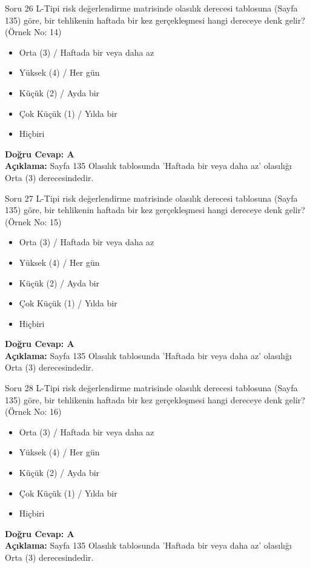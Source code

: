 \documentclass[12pt,a4paper]{article}
\begin{document}
\begin{testcard}{Soru 26}
    L-Tipi risk değerlendirme matrisinde olasılık derecesi tablosuna (Sayfa 135) göre, bir tehlikenin haftada bir kez gerçekleşmesi hangi dereceye denk gelir? (Örnek No: 14)
    \begin{itemize}
        \item[A)] Orta (3) / Haftada bir veya daha az
        \item[B)] Yüksek (4) / Her gün
        \item[C)] Küçük (2) / Ayda bir
        \item[D)] Çok Küçük (1) / Yılda bir
        \item[E)] Hiçbiri
    \end{itemize}
    \tcblower
    \textbf{Doğru Cevap: A} \\
    \textbf{Açıklama:} Sayfa 135 Olasılık tablosunda 'Haftada bir veya daha az' olasılığı Orta (3) derecesindedir.
\end{testcard}

\begin{testcard}{Soru 27}
    L-Tipi risk değerlendirme matrisinde olasılık derecesi tablosuna (Sayfa 135) göre, bir tehlikenin haftada bir kez gerçekleşmesi hangi dereceye denk gelir? (Örnek No: 15)
    \begin{itemize}
        \item[A)] Orta (3) / Haftada bir veya daha az
        \item[B)] Yüksek (4) / Her gün
        \item[C)] Küçük (2) / Ayda bir
        \item[D)] Çok Küçük (1) / Yılda bir
        \item[E)] Hiçbiri
    \end{itemize}
    \tcblower
    \textbf{Doğru Cevap: A} \\
    \textbf{Açıklama:} Sayfa 135 Olasılık tablosunda 'Haftada bir veya daha az' olasılığı Orta (3) derecesindedir.
\end{testcard}

\begin{testcard}{Soru 28}
    L-Tipi risk değerlendirme matrisinde olasılık derecesi tablosuna (Sayfa 135) göre, bir tehlikenin haftada bir kez gerçekleşmesi hangi dereceye denk gelir? (Örnek No: 16)
    \begin{itemize}
        \item[A)] Orta (3) / Haftada bir veya daha az
        \item[B)] Yüksek (4) / Her gün
        \item[C)] Küçük (2) / Ayda bir
        \item[D)] Çok Küçük (1) / Yılda bir
        \item[E)] Hiçbiri
    \end{itemize}
    \tcblower
    \textbf{Doğru Cevap: A} \\
    \textbf{Açıklama:} Sayfa 135 Olasılık tablosunda 'Haftada bir veya daha az' olasılığı Orta (3) derecesindedir.
\end{testcard}
\end{document}
